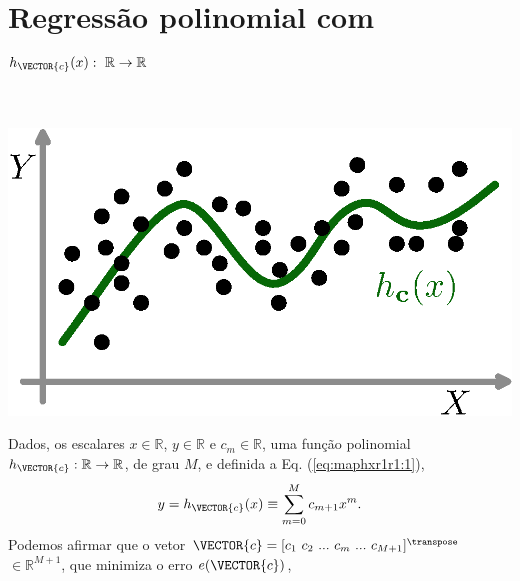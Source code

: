 \section{Regressão polinomial com
$h_{\VECTOR{c}}(x):~\mathbb{R} \rightarrow \mathbb{R}$}
\label{sec:theo:maphxr1r1}



\begin{theorem}
\label{theo:maphxr1r1}
~\\
\begin{minipage}{0.4\textwidth}
\centering
\includegraphics[width=0.95\linewidth]{chapters/mapeamento/mapeamento-hx.eps} 
\end{minipage}
\begin{minipage}{0.6\textwidth}
Dados,
os escalares $x \in \mathbb{R}$, $y \in \mathbb{R}$ e $c_m \in \mathbb{R}$,
uma função polinomial $h_{\VECTOR{c}}:\mathbb{R} \rightarrow \mathbb{R}$, de grau $M$, e 
definida a Eq. (\ref{eq:maphxr1r1:1}),
\begin{equation}\label{eq:maphxr1r1:1}
y=h_{\VECTOR{c}}(x)\equiv \sum_{m=0}^{M}c_{m+1} x^m.
\end{equation}
Podemos afirmar que o vetor $\VECTOR{c}=[c_1~ c_2~ ...~ c_m~ ...~ c_{M+1}]^{\transpose}$ $\in \mathbb{R}^{M+1}$,
que minimiza o erro $e(\VECTOR{c})$,
\end{minipage}


\end{theorem}
